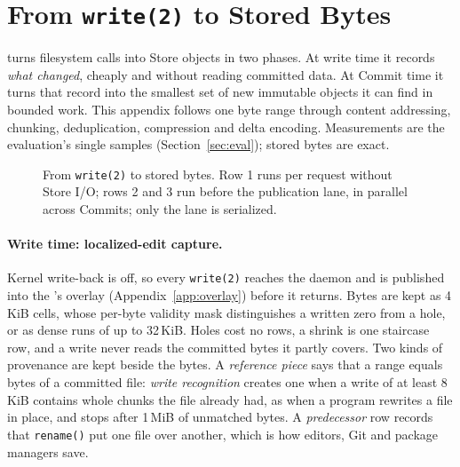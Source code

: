 \section{From \texttt{write(2)} to Stored Bytes}
\label{app:pipeline}

\sys{} turns filesystem calls into Store objects in two phases. At write time it records
\emph{what changed}, cheaply and without reading committed data. At Commit time it turns
that record into the smallest set of new immutable objects it can find in bounded work.
This appendix follows one byte range through content addressing, chunking, deduplication,
compression and delta encoding. Measurements are the evaluation's single samples
(Section~\ref{sec:eval}); stored bytes are exact.

\begin{figure}[h]
\centering
\resizebox{\linewidth}{!}{}
\caption{From \texttt{write(2)} to stored bytes. Row 1 runs per request without Store I/O; rows 2 and 3 run before the publication lane, in parallel across Commits; only the lane is serialized.}
\label{fig:pipeline}
\end{figure}

\paragraph{Write time: localized-edit capture.} Kernel write-back is off, so every
\texttt{write(2)} reaches the daemon and is published into the \ws{}'s overlay
(Appendix~\ref{app:overlay}) before it returns. Bytes are kept as 4\,KiB cells, whose
per-byte validity mask distinguishes a written zero from a hole, or as dense runs of up
to 32\,KiB. Holes cost no rows, a shrink is one staircase row, and a write never reads
the committed bytes it partly covers. Two kinds of provenance are kept beside the bytes.
A \emph{reference piece} says that a range equals bytes of a committed file: \emph{write
recognition} creates one when a write of at least 8\,KiB contains whole chunks the file
already had, as when a program rewrites a file in place, and stops after 1\,MiB of
unmatched bytes. A \emph{predecessor} row records that \texttt{rename()} put one file
over another, which is how editors, Git and package managers save.

